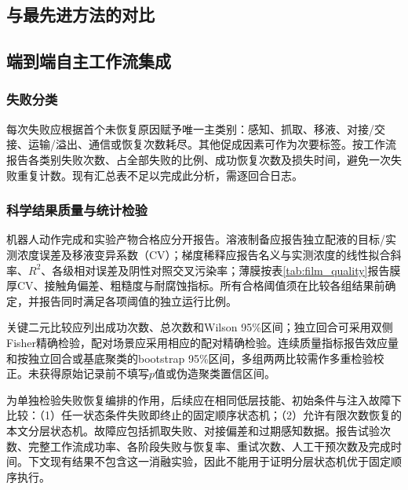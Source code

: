 \subsection{与最先进方法的对比}
\label{subsec:exp_sota}



\subsection{端到端自主工作流集成}
\label{subsec:exp_end_to_end}

\subsubsection{失败分类}
每次失败应根据首个未恢复原因赋予唯一主类别：感知、抓取、移液、对接/交接、运输/溢出、通信或恢复次数耗尽。其他促成因素可作为次要标签。按工作流报告各类别失败次数、占全部失败的比例、成功恢复次数及损失时间，避免一次失败重复计数。现有汇总表不足以完成此分析，需逐回合日志。

\subsubsection{科学结果质量与统计检验}
机器人动作完成和实验产物合格应分开报告。溶液制备应报告独立配液的目标/实测浓度误差及移液变异系数（CV）；梯度稀释应报告名义与实测浓度的线性拟合斜率、$R^2$、各级相对误差及阴性对照交叉污染率；薄膜按表\ref{tab:film_quality}报告膜厚CV、接触角偏差、粗糙度与耐腐蚀指标。所有合格阈值须在比较各组结果前确定，并报告同时满足各项阈值的独立运行比例。

关键二元比较应列出成功次数、总次数和Wilson 95\%区间；独立回合可采用双侧Fisher精确检验，配对场景应采用相应的配对精确检验。连续质量指标报告效应量和按独立回合或基底聚类的bootstrap 95\%区间，多组两两比较需作多重检验校正。未获得原始记录前不填写$p$值或伪造聚类置信区间。

为单独检验失败恢复编排的作用，后续应在相同低层技能、初始条件与注入故障下比较：（1）任一状态条件失败即终止的固定顺序状态机；（2）允许有限次数恢复的本文分层状态机。故障应包括抓取失败、对接偏差和过期感知数据。报告试验次数、完整工作流成功率、各阶段失败与恢复率、重试次数、人工干预次数及完成时间。下文现有结果不包含这一消融实验，因此不能用于证明分层状态机优于固定顺序执行。

